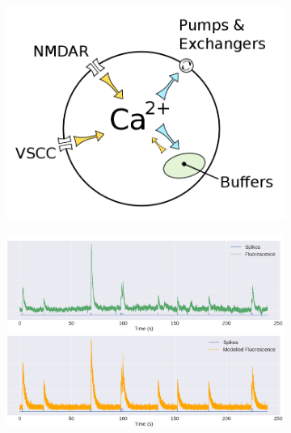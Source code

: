 \documentclass[a4paper,12pt]{article}
\theoremstyle{definition}
\begin{document}
\begin{figure}[t]
  \centering
  \begin{subfigure}[b]{0.45\textwidth}
    \includegraphics[width=\textwidth]{camodel.png}
    \caption{}
    \label{subfig:camodel}
  \end{subfigure}
  \begin{subfigure}[b]{0.45\textwidth}
    \includegraphics[width=\textwidth]{example_trace.png}
    \caption{}
    \label{subfig:example_trace}
  \end{subfigure}
  \begin{subfigure}[b]{0.45\textwidth}

\end{subfigure}
\end{figure}
\end{document}
